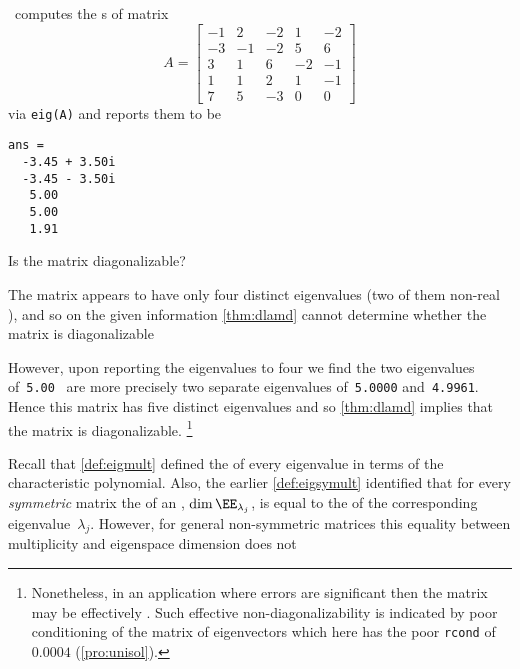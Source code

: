 \begin{example} 
\script\ computes the s of matrix
\begin{equation*}
A=\begin{bmatrix}-1&2&-2&1&-2
\\-3&-1&-2&5&6
\\3&1&6&-2&-1
\\1&1&2&1&-1
\\7&5&-3&0&0 \end{bmatrix}
\end{equation*}
via \verb|eig(A)| and reports them to be \twodp
\begin{verbatim}
ans =
  -3.45 + 3.50i
  -3.45 - 3.50i
   5.00
   5.00
   1.91
\end{verbatim}
Is the matrix diagonalizable?
\begin{solution} 
The matrix appears to have only four distinct eigenvalues (two of them non-real ), and so on the given information \cref{thm:dlamd} cannot determine whether the matrix is diagonalizable 

However, upon reporting the eigenvalues to four  we find the two eigenvalues of~\verb|5.00| \twodp\ are more precisely two separate eigenvalues of~\verb|5.0000| and~\verb|4.9961|.
Hence this matrix has five distinct eigenvalues and so \cref{thm:dlamd} implies that the matrix is diagonalizable.%
\footnote{Nonetheless, in an application where errors are significant then the matrix may be effectively .
Such effective non-diagonalizability is indicated by poor conditioning of the matrix of eigenvectors which here has the poor \texttt{rcond} of~\(0.0004\) (\cref{pro:unisol}).}
\end{solution}
\end{example}





Recall that \cref{def:eigmult} defined the  of every eigenvalue in terms of the characteristic polynomial.
Also, the earlier \cref{def:eigsymult} identified that for every \emph{symmetric} matrix the  of an , \(\dim\EE_{\lambda_j}\), is equal to the  of the corresponding eigenvalue~\(\lambda_j\).
However, for general non-symmetric matrices this equality between multiplicity and eigenspace dimension does not 


